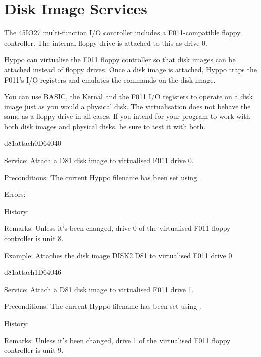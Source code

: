 \newpage
\section{Disk Image Services}

The 45IO27 multi-function I/O controller includes a F011-compatible floppy
controller. The internal floppy drive is attached to this as drive 0.

Hyppo can virtualise the F011 floppy controller so that disk images
can be attached instead of floppy drives. Once a disk image is attached,
Hyppo traps the F011's I/O registers and emulates the commands on the disk
image.

You can use BASIC, the Kernal and the F011 I/O registers to operate on a disk
image just as you would a physical disk. The virtualisation does not behave the
same as a floppy drive in all cases. If you intend for your program to work
with both disk images and physical disks, be sure to test it with both.


\begin{hyppotrap}{d81attach0}{D640}{40}
\item [Service:]
  Attach a D81 disk image to virtualised F011 drive 0.
\item [Preconditions:]
  The current Hyppo filename has been set using .
\item [Errors:]
\item [History:]
\item [Remarks:]
  Unless it's been changed, drive 0 of the virtualised F011 floppy controller is
  unit 8.
\item [Example:]
  Attaches the disk image DISK2.D81 to virtualised F011 drive 0.
\end{hyppotrap}


\newpage
\begin{hyppotrap}{d81attach1}{D640}{46}
\item [Service:]
  Attach a D81 disk image to virtualised F011 drive 1.
\item [Preconditions:]
  The current Hyppo filename has been set using .
\item [History:]
\item [Remarks:]
  Unless it's been changed, drive 1 of the virtualised F011 floppy controller is
  unit 9.
\end{hyppotrap}


